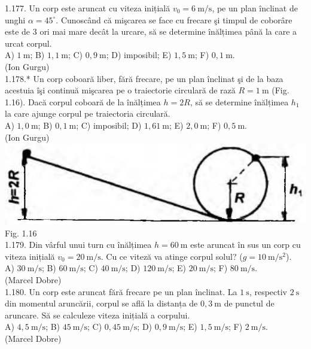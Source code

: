 1.177. Un corp este aruncat cu viteza inițială $v_{0}=6 \mathrm{~m} / \mathrm{s}$, pe un plan înclinat de unghi $\alpha=45^{\circ}$. Cunoscând că mişcarea se face cu frecare şi timpul de coborâre este de 3 ori mai mare decât la urcare, să se determine înălțimea până la care a urcat corpul.\\ A) $1 \mathrm{~m}$; B) $1,1 \mathrm{~m}$; C) $0,9 \mathrm{~m}$; D) imposibil; E) $1,5 \mathrm{~m}$; F) $0,1 \mathrm{~m}$.\\ (Ion Gurgu)\\

1.178.* Un corp coboară liber, fără frecare, pe un plan înclinat şi de la baza acestuia îşi continuă mişcarea pe o traiectorie circulară de rază $R=1 \mathrm{~m}$ (Fig. 1.16). Dacă corpul coboară de la înălțimea $h=2 R$, să se determine înălțimea $h_{1}$ la care ajunge corpul pe traiectoria circulară.\\ A) $1,0 \mathrm{~m}$; B) $0,1 \mathrm{~m}$; C) imposibil; D) $1,61 \mathrm{~m}$; E) $2,0 \mathrm{~m}$; F) $0,5 \mathrm{~m}$.\\ (Ion Gurgu)\\ \includegraphics[width=0.4\linewidth]{images/2025_07_01_5b3ff9fa0d508c8e9f17g-042(1)} Fig. 1.16\\

1.179. Din vârful unui turn cu înălțimea $h=60 \mathrm{~m}$ este aruncat în sus un corp cu viteza inițială $v_{0}=20 \mathrm{~m} / \mathrm{s}$. Cu ce viteză va atinge corpul solul? ($g=10 \mathrm{~m} / \mathrm{s}^{2}$).\\ A) $30 \mathrm{~m} / \mathrm{s}$; B) $60 \mathrm{~m} / \mathrm{s}$; C) $40 \mathrm{~m} / \mathrm{s}$; D) $120 \mathrm{~m} / \mathrm{s}$; E) $20 \mathrm{~m} / \mathrm{s}$; F) $80 \mathrm{~m} / \mathrm{s}$.\\ (Marcel Dobre)\\

1.180. Un corp este aruncat fără frecare pe un plan înclinat. La $1 \mathrm{~s}$, respectiv $2 \mathrm{~s}$ din momentul aruncării, corpul se află la distanța de $0,3 \mathrm{~m}$ de punctul de aruncare. Să se calculeze viteza inițială a corpului.\\ A) $4,5 \mathrm{~m} / \mathrm{s}$; B) $45 \mathrm{~m} / \mathrm{s}$; C) $0,45 \mathrm{~m} / \mathrm{s}$; D) $0,9 \mathrm{~m} / \mathrm{s}$; E) $1,5 \mathrm{~m} / \mathrm{s}$; F) $2 \mathrm{~m} / \mathrm{s}$.\\ (Marcel Dobre)\\

